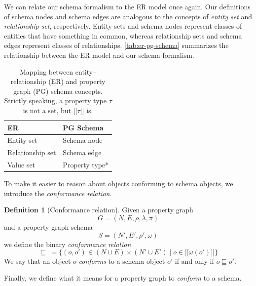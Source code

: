 \documentclass{report}
\theoremstyle{definition}
\newtheorem{definition}{Definition}
\newcommand{\ptype}{\tau}
\newcommand{\lsem}{\ensuremath{[\![}}
\newcommand{\rsem}{\ensuremath{]\!]}}
\newcommand{\sem}[1]{\ensuremath{\lsem #1 \rsem}}
\newcommand{\conf}{\sqsubseteq}
\begin{document}
We can relate our schema formalism to the ER model once again. Our definitions of schema nodes and schema edges are analogous to the concepts of \emph{entity set} and \emph{relationship set}, respectively. Entity sets and schema nodes represent classes of entities that have something in common, whereas relationship sets and schema edges represent classes of relationships. \autoref{tab:er-pg-schema} summarizes the relationship between the ER model and our schema formalism.

\begin{table}[t]
  \centering
  \begin{tabular}{ll}
    \hline
    \textbf{ER}      & \textbf{PG Schema} \\
    \hline
    Entity set       & Schema node        \\
    Relationship set & Schema edge        \\
    Value set        & Property type*     \\
    \hline
  \end{tabular}
  \caption[Mapping between entity--relationship and property graph schema concepts]{Mapping between entity--relationship (ER) and property graph (PG) schema concepts. Strictly speaking, a property type $\ptype$ is not a set, but $\sem{\ptype}$ is.}
  \label{tab:er-pg-schema}
\end{table}

To make it easier to reason about objects conforming to schema objects, we introduce the \emph{conformance relation}.

\begin{definition}[Conformance relation]
  Given a property graph $$G = (N, E, \rho, \lambda, \pi)$$ and a property graph schema $$S = (N', E', \rho', \omega)$$ we define the binary \emph{conformance relation} $$\conf \; = \{(o, o') \in (N \cup E) \times (N' \cup E') \mid o \in \sem{\omega(o')}\}$$ We say that an object $o$ \emph{conforms} to a schema object $o'$ if and only if $o \conf o'$.
\end{definition}

Finally, we define what it means for a property graph to \emph{conform} to a schema.
\end{document}
